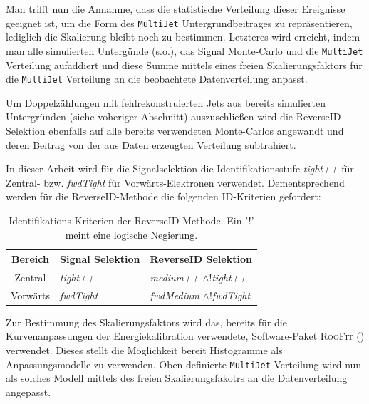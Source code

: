 Man trifft nun die Annahme, dass die statistische Verteilung dieser Ereignisse
geeignet ist, um die Form des \texttt{MultiJet} Untergrundbeitrages zu
repräsentieren, lediglich die Skalierung bleibt noch zu bestimmen. Letzteres
wird erreicht, indem man alle simulierten Untergünde (s.o.), das Signal
Monte-Carlo und die \texttt{MultiJet} Verteilung aufaddiert und diese Summe
mittels eines freien Skalierungsfaktors für die \texttt{MultiJet} Verteilung an
die beobachtete Datenverteilung anpasst.

Um Doppelzählungen mit fehlrekonstruierten Jets aus bereits simulierten
Untergründen (siehe voheriger Abschnitt) auszuschließen wird die ReverseID
Selektion ebenfalls auf alle bereits verwendeten Monte-Carlos angewandt und
deren Beitrag von der aus Daten erzeugten Verteilung subtrahiert.

In dieser Arbeit wird für die Signalselektion die Identifikationsstufe
\textit{tight++} für Zentral- bzw. \textit{fwdTight} für Vorwärts-Elektronen
verwendet. Dementsprechend werden für die ReverseID-Methode die folgenden
ID-Kriterien gefordert:
\begin{table}[h]
    \centering
    \begin{tabular}{
                        |c|
                        >{\centering\arraybackslash}p{45mm} |
                        >{\centering\arraybackslash}p{45mm} |
                   }
        \hline
        \bf{Bereich} & \bf{Signal Selektion} & \bf{ReverseID Selektion} \\
        \hline\hline
        Zentral  & \it{tight++}  & \textit{medium++} $\wedge$!\it{tight++} \\
        \hline
        Vorwärts & \it{fwdTight} & \textit{fwdMedium} $\wedge$!\it{fwdTight} \\
        \hline
    \end{tabular}
    \caption[Identifikations Kriterien der ReverseID-Methode]
        {Identifikations Kriterien der ReverseID-Methode. Ein '!' meint eine
        logische Negierung.}
    \label{tab:reverseID}
\end{table}

Zur Bestimmung des Skalierungsfaktors wird das, bereits für die
Kurvenanpassungen der Energiekalibration verwendete, Software-Paket
\textsc{RooFit} (\cite{Verkerke:2003ir}) verwendet. Dieses stellt die
Möglichkeit bereit Histogramme als Anpassungsmodelle zu verwenden. Oben
definierte \texttt{MultiJet} Verteilung wird nun als solches Modell mittels des
freien Skalierungsfakotrs an die Datenverteilung angepasst.

